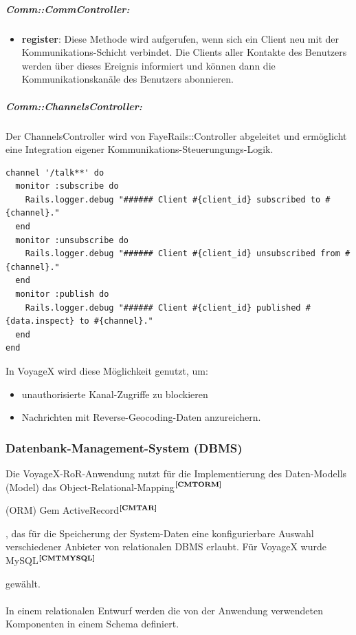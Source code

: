 \subparagraph{Comm::CommController:}
\begin{itemize}[leftmargin=*,noitemsep,topsep=1ex,parsep=0pt,partopsep=0pt]
\item \textbf{register}: Diese Methode wird aufgerufen, wenn sich ein Client neu mit der Kommunikations-Schicht verbindet.
Die Clients aller Kontakte des Benutzers werden über dieses Ereignis informiert und können dann die Kommunikationskanäle des Benutzers abonnieren.
\end{itemize}
\subparagraph{Comm::ChannelsController:}\label{CTRLS_CHANNEL}
Der ChannelsController wird von FayeRails::Controller abgeleitet und ermöglicht eine Integration eigener Kommunikations-Steuerungungs-Logik.\\
\lstset{language=CoffeeScript}
\begin{lstlisting}[frame=single,xleftmargin=0pt,numbers=none]
channel '/talk**' do
  monitor :subscribe do
    Rails.logger.debug "###### Client #{client_id} subscribed to #{channel}."
  end
  monitor :unsubscribe do
    Rails.logger.debug "###### Client #{client_id} unsubscribed from #{channel}."
  end
  monitor :publish do
    Rails.logger.debug "###### Client #{client_id} published #{data.inspect} to #{channel}."
  end
end
\end{lstlisting}
In VoyageX wird diese Möglichkeit genutzt, um:
\begin{itemize}[leftmargin=*,noitemsep,topsep=1ex,parsep=0pt,partopsep=0pt]
\item unauthorisierte Kanal-Zugriffe zu blockieren
\item Nachrichten mit Reverse-Geocoding-Daten anzureichern.
\end{itemize}

\subsubsection{Datenbank-Management-System (DBMS)}
Die VoyageX-RoR-Anwendung nutzt für die Implementierung des Daten-Modells (Model) das Object-Relational-Mapping$^{\textbf{\ref{CMTORM}}}$%
\addtocounter{footnote}{1}%
(ORM) Gem ActiveRecord$^{\textbf{\ref{CMTAR}}}$%
\addtocounter{footnote}{1}%
, das für die Speicherung der System-Daten eine konfigurierbare Auswahl verschiedener Anbieter von relationalen DBMS erlaubt. Für VoyageX wurde MySQL$^{\textbf{\ref{CMTMYSQL}}}$%
\addtocounter{footnote}{1}%
 gewählt.\\ \\
In einem relationalen Entwurf werden die von der Anwendung verwendeten Komponenten in einem Schema definiert.
